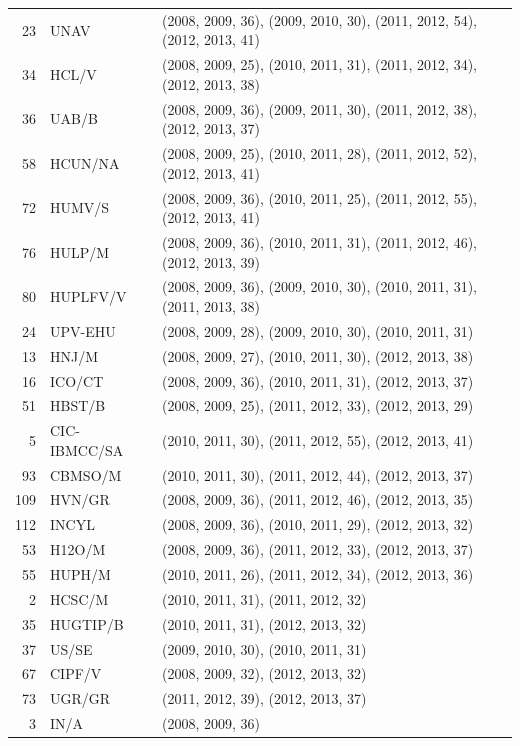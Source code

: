 \documentclass[a4paper,twoside,10pt]{article}
\begin{document}
\begin{center}
\begin{longtable}{rlp{8.5cm}}
 23 & UNAV         &(2008, 2009, 36), (2009, 2010, 30), (2011, 2012, 54), (2012, 2013, 41)\\
 34 & HCL/V        &(2008, 2009, 25), (2010, 2011, 31), (2011, 2012, 34), (2012, 2013, 38)\\
 36 & UAB/B        &(2008, 2009, 36), (2009, 2011, 30), (2011, 2012, 38), (2012, 2013, 37)\\
 58 & HCUN/NA      &(2008, 2009, 25), (2010, 2011, 28), (2011, 2012, 52), (2012, 2013, 41)\\
 72 & HUMV/S       &(2008, 2009, 36), (2010, 2011, 25), (2011, 2012, 55), (2012, 2013, 41)\\
 76 & HULP/M       &(2008, 2009, 36), (2010, 2011, 31), (2011, 2012, 46), (2012, 2013, 39)\\
 80 & HUPLFV/V     &(2008, 2009, 36), (2009, 2010, 30), (2010, 2011, 31), (2011, 2013, 38)\\
 24 & UPV-EHU      &(2008, 2009, 28), (2009, 2010, 30), (2010, 2011, 31)\\
 13 & HNJ/M        &(2008, 2009, 27), (2010, 2011, 30), (2012, 2013, 38)\\
 16 & ICO/CT       &(2008, 2009, 36), (2010, 2011, 31), (2012, 2013, 37)\\
 51 & HBST/B       &(2008, 2009, 25), (2011, 2012, 33), (2012, 2013, 29)\\
  5 & CIC-IBMCC/SA &(2010, 2011, 30), (2011, 2012, 55), (2012, 2013, 41)\\
 93 & CBMSO/M      &(2010, 2011, 30), (2011, 2012, 44), (2012, 2013, 37)\\
109 & HVN/GR       &(2008, 2009, 36), (2011, 2012, 46), (2012, 2013, 35)\\
112 & INCYL        &(2008, 2009, 36), (2010, 2011, 29), (2012, 2013, 32)\\
 53 & H12O/M       &(2008, 2009, 36), (2011, 2012, 33), (2012, 2013, 37)\\
 55 & HUPH/M       &(2010, 2011, 26), (2011, 2012, 34), (2012, 2013, 36)\\
  2 & HCSC/M       &(2010, 2011, 31), (2011, 2012, 32)\\
 35 & HUGTIP/B     &(2010, 2011, 31), (2012, 2013, 32)\\
 37 & US/SE        &(2009, 2010, 30), (2010, 2011, 31)\\
 67 & CIPF/V       &(2008, 2009, 32), (2012, 2013, 32)\\
 73 & UGR/GR       &(2011, 2012, 39), (2012, 2013, 37)\\
  3 & IN/A         &(2008, 2009, 36)\\

\end{longtable}
\end{center}
\end{document}
